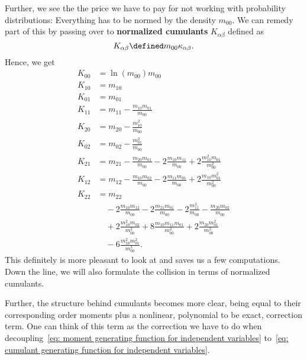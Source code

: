 Further, we see the the price we have to pay for not working with probability distributions: Everything has to be normed by the density $m_{00}$.
We can remedy part of this by passing over to \textbf{normalized cumulants} $K_{\alpha\beta}$ defined as
\begin{equation}
  \label{eq: definition normalized cumulants}
  K_{\alpha\beta} \defined m_{00}\kappa_{\alpha\beta}.
\end{equation}
Hence, we get
\begin{align}
  K_{00} & = \ln(m_{00})m_{00} \label{eq: K 00 from moments}\\
  K_{10} & = m_{10} \label{eq: K 10 from moments}\\
  K_{01} & = m_{01} \label{eq: K 01 from moments}\\
  K_{11} & = m_{11} - \frac{m_{10}m_{01}}{m_{00}} \label{eq: K 11 from moments} \\
  K_{20} & = m_{20} - \frac{m_{10}^2}{m_{00}} \label{eq: K 20 from moments}\\
  K_{02} & = m_{02} - \frac{m_{01}^2}{m_{00}} \label{eq: K 02 from moments}\\
  K_{21} & = m_{21} - \frac{m_{20}m_{01}}{m_{00}}
       - 2\frac{m_{10}m_{11}}{m_{00}} + 2\frac{m_{10}^2 m_{01}}{m_{00}^2} \label{eq: K 21 from moments}\\
  K_{12} & = m_{12} - \frac{m_{10}m_{02}}{m_{00}}
       - 2\frac{m_{11}m_{01}}{m_{00}} + 2\frac{m_{10} m_{01}^2}{m_{00}^2} \label{eq: K 12 from moments}\\
  K_{22} & = m_{22} \nonumber \\
       & \quad - 2 \frac{m_{10}m_{12}}{m_{00}} - 2\frac{m_{21}m_{01}}{m_{00}}
        - 2 \frac{m_{11}^2}{m_{00}} - \frac{m_{20}m_{02}}{m_{00}}\nonumber \\
       & \quad + 2 \frac{m_{10}^2 m_{02}}{m_{00}^2} + 8 \frac{m_{10}m_{11}m_{01}}{m_{00}^2}
        + 2 \frac{m_{20}m_{01}^2}{m_{00}^2} \nonumber \\
       & \quad - 6 \frac{m_{10}^2 m_{01}^2}{m_{00}^3}\label{eq: K 22 from moments}.
\end{align}
This definitely is more pleasant to look at and saves us a few computations.
Down the line, we will also formulate the collision in terms of normalized cumulants.

Further, the structure behind cumulants becomes more clear, being equal to their corresponding order moments plus a nonlinear, polynomial to be exact, correction term.
One can think of this term as the correction we have to do when decoupling~\eqref{eq: moment generating function for independent variables}
to~\eqref{eq: cumulant generating function for independent variables}.
